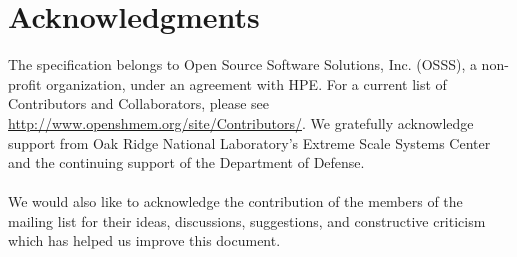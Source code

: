 \date{\today}

\section*{Acknowledgments}
The \openshmem specification belongs to Open Source Software Solutions, Inc.
(OSSS), a non-profit organization, under an agreement with HPE. For a current list
of Contributors and Collaborators, please see
  \url{http://www.openshmem.org/site/Contributors/}.
We gratefully acknowledge support from
Oak Ridge National Laboratory's
Extreme Scale Systems Center and the continuing support of the Department of Defense.\\
\\
We would also like to acknowledge the contribution of the members of the
\openshmem mailing list for their ideas, discussions, suggestions, and
constructive criticism which has helped us improve this document.\\
